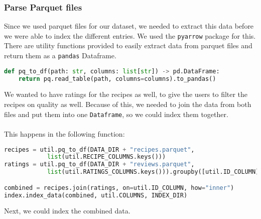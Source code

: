 \documentclass{article}
\begin{document}
\subsubsection{Parse Parquet files}
Since we used parquet files for our dataset, we needed to extract this data before
we were able to index the different entries. We used the \texttt{pyarrow} package
for this. There are utility functions provided to easily extract data from
parquet files and return them as a \texttt{pandas} Dataframe.
\begin{lstlisting}[language=Python]
def pq_to_df(path: str, columns: list[str]) -> pd.DataFrame:
    return pq.read_table(path, columns=columns).to_pandas()
\end{lstlisting}
We wanted to have ratings for the recipes as well, to give the users to filter
the recipes on quality as well. Because of this, we needed to join
the data from both files and put them into one \texttt{Dataframe}, so we
could index them together.\\~\\
This happens in the following function:
\begin{lstlisting}[language=Python]
recipes = util.pq_to_df(DATA_DIR + "recipes.parquet",
            list(util.RECIPE_COLUMNS.keys()))
ratings = util.pq_to_df(DATA_DIR + "reviews.parquet",
            list(util.RATINGS_COLUMNS.keys())).groupby([util.ID_COLUMN]).mean()

combined = recipes.join(ratings, on=util.ID_COLUMN, how="inner")
index.index_data(combined, util.COLUMNS, INDEX_DIR)
\end{lstlisting}
Next, we could index the combined data.
\end{document}
